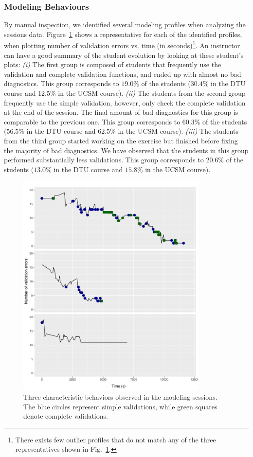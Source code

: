 \subsubsection{Modeling Behaviours}

By manual inspection, we identified several modeling profiles when analyzing the sessions data.
Figure~\ref{fig:profiles} shows a representative for each of the identified profiles, when plotting number of validation errors vs.
time (in seconds)\footnote{There exists few outlier profiles that do not match any of the three representatives shown in Fig.~\ref{fig:profiles}.}.
An instructor can have a good summary of the student evolution by looking at these student's plots:
\emph{(i)} The first group is composed of students that frequently use the validation and complete validation functions, and ended up with almost no bad diagnostics. This group corresponds to $19.0\%$ of the students ($30.4\%$ in the DTU course and $12.5\%$ in the UCSM course).
\emph{(ii)} The students from the second group frequently use the simple validation, however, only check the complete validation at the end of the session. The final amount of bad diagnostics for this group is comparable to the previous one. This group corresponds to $60.3\%$ of the students ($56.5\%$ in the DTU course and $62.5\%$ in the UCSM course).
\emph{(iii)} The students from the third group started working on the exercise but finished before fixing the majority of bad diagnostics. We have observed that the students in this group performed substantially less validations. This group corresponds to $20.6\%$ of the students ($13.0\%$ in the DTU course and $15.8\%$ in the UCSM course).

\begin{figure}
  \centering
\includegraphics[width=0.85\textwidth]{figures/results/profiles.png}
\caption{Three characteristic behaviors observed in the modeling sessions. The blue circles represent simple validations, while green squares denote complete validations.}
\label{fig:profiles}
\end{figure}


